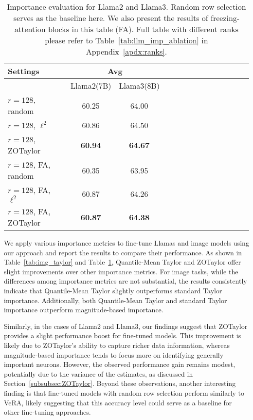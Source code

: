 \begin{table}[htbp]
\tiny
\begin{center}
\begin{tabular}{lccccccccccccc}\toprule
Settings & \multicolumn{2}{c}{Avg}
\\\midrule
 & Llama2(7B) & Llama3(8B) \\\midrule
$r=128$, random & 60.25 & 64.00 \\
$r=128$, $\ell^2$ & 60.86 & 64.50 \\
$r=128$, ZOTaylor & \textbf{60.94} & \textbf{64.67} \\\cmidrule(lr){1-3}
$r=128$, FA, random & 60.35 & 63.95 \\
$r=128$, FA, $\ell^2$ & 60.87 & 64.26 \\
$r=128$, FA, ZOTaylor & \textbf{60.87} & \textbf{64.38} \\\bottomrule
\end{tabular}
\caption{Importance evaluation for Llama2 and Llama3. Random row selection serves as the baseline here. We also present the results of freezing-attention blocks in this table (FA). Full table with different ranks please refer to Table~\ref{tab:llm_imp_ablation} in Appendix~\ref{apdx:ranks}.} \label{tab:llm_imp} 
\end{center}
\end{table}

We apply various importance metrics to fine-tune Llamas and image models using our approach and report the results to compare their performance. As shown in Table~\ref{tab:img_taylor} and Table~\ref{tab:llm_imp}, Quantile-Mean Taylor and ZOTaylor offer slight improvements over other importance metrics. For image tasks, while the differences among importance metrics are not substantial, the results consistently indicate that Quantile-Mean Taylor slightly outperforms standard Taylor importance. Additionally, both Quantile-Mean Taylor and standard Taylor importance outperform magnitude-based importance.

Similarly, in the cases of Llama2 and Llama3, our findings suggest that ZOTaylor provides a slight performance boost for fine-tuned models. This improvement is likely due to ZOTaylor's ability to capture richer data information, whereas magnitude-based importance tends to focus more on identifying generally important neurons. However, the observed performance gain remains modest, potentially due to the variance of the estimates, as discussed in Section~\ref{subsubsec:ZOTaylor}. Beyond these observations, another interesting finding is that fine-tuned models with random row selection perform similarly to VeRA, likely suggesting that this accuracy level could serve as a baseline for other fine-tuning approaches.

